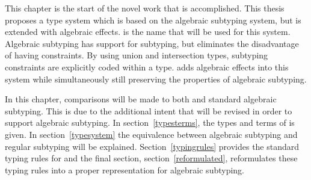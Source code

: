 This chapter is the start of the novel work that is accomplished. This thesis proposes a type system which is based on the algebraic subtyping system, but is extended with algebraic effects. \core is the name that will be used for this system. Algebraic subtyping has support for subtyping, but eliminates the disadvantage of having constraints. By using union and intersection types, subtyping constraints are explicitly coded within a type. \core adds algebraic effects into this system while simultaneously still preserving the properties of algebraic subtyping.

In this chapter, comparisons will be made to both \eff and standard algebraic subtyping. This is due to the additional intent that \eff will be revised in order to support algebraic subtyping. In section~\ref{typesterms}, the types and terms of \core is given. In section~\ref{typesystem} the equivalence between algebraic subtyping and regular subtyping will be explained. Section~\ref{typingrules} provides the standard typing rules for \core and the final section, section~\ref{reformulated}, reformulates these typing rules into a proper representation for algebraic subtyping.